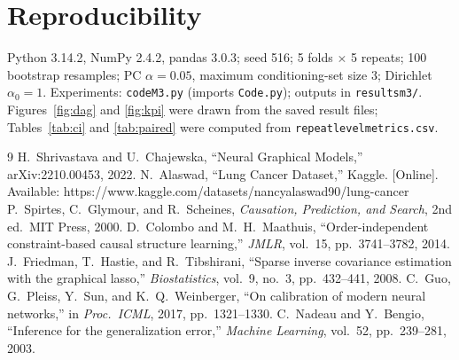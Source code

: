 \documentclass[10pt,twocolumn,letterpaper]{article}
\renewcommand{\_}{\textunderscore\hspace{0pt}}
\begin{document}
\section*{Reproducibility}
\small
Python 3.14.2, NumPy 2.4.2, pandas 3.0.3; seed 516; 5 folds $\times$ 5 repeats; 100 bootstrap resamples; PC $\alpha=0.05$, maximum conditioning-set size 3; Dirichlet $\alpha_0=1$. Experiments: \texttt{code\_M3.py} (imports \texttt{Code.py}); outputs in \texttt{results\_m3/}. Figures~\ref{fig:dag} and \ref{fig:kpi} were drawn from the saved result files; Tables~\ref{tab:ci} and \ref{tab:paired} were computed from \texttt{repeat\_level\_metrics.csv}.

\begingroup
\small
\begin{thebibliography}{9}
 H.~Shrivastava and U.~Chajewska, ``Neural Graphical Models,'' arXiv:2210.00453, 2022.
 N.~Alaswad, ``Lung Cancer Dataset,'' Kaggle. [Online]. Available: https://www.kaggle.com/datasets/nancyalaswad90/lung-cancer
 P.~Spirtes, C.~Glymour, and R.~Scheines, \emph{Causation, Prediction, and Search}, 2nd ed.\ MIT Press, 2000.
 D.~Colombo and M.~H.~Maathuis, ``Order-independent constraint-based causal structure learning,'' \emph{JMLR}, vol.~15, pp.~3741--3782, 2014.
 J.~Friedman, T.~Hastie, and R.~Tibshirani, ``Sparse inverse covariance estimation with the graphical lasso,'' \emph{Biostatistics}, vol.~9, no.~3, pp.~432--441, 2008.
 C.~Guo, G.~Pleiss, Y.~Sun, and K.~Q.~Weinberger, ``On calibration of modern neural networks,'' in \emph{Proc.\ ICML}, 2017, pp.~1321--1330.
 C.~Nadeau and Y.~Bengio, ``Inference for the generalization error,'' \emph{Machine Learning}, vol.~52, pp.~239--281, 2003.
\end{thebibliography}
\endgroup
\end{document}
